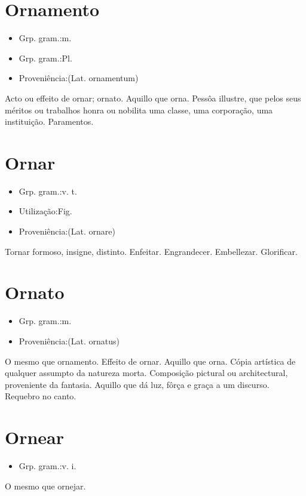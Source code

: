 \section{Ornamento}
\begin{itemize}
\item {Grp. gram.:m.}
\end{itemize}
\begin{itemize}
\item {Grp. gram.:Pl.}
\end{itemize}
\begin{itemize}
\item {Proveniência:(Lat. \textunderscore ornamentum\textunderscore )}
\end{itemize}
Acto ou effeito de ornar; ornato.
Aquillo que orna.
Pessôa illustre, que pelos seus méritos ou trabalhos honra ou nobilita uma classe, uma corporação, uma instituição.
Paramentos.
\section{Ornar}
\begin{itemize}
\item {Grp. gram.:v. t.}
\end{itemize}
\begin{itemize}
\item {Utilização:Fig.}
\end{itemize}
\begin{itemize}
\item {Proveniência:(Lat. \textunderscore ornare\textunderscore )}
\end{itemize}
Tornar formoso, insigne, distinto.
Enfeitar.
Engrandecer.
Embellezar.
Glorificar.
\section{Ornato}
\begin{itemize}
\item {Grp. gram.:m.}
\end{itemize}
\begin{itemize}
\item {Proveniência:(Lat. \textunderscore ornatus\textunderscore )}
\end{itemize}
O mesmo que \textunderscore ornamento\textunderscore .
Effeito de ornar.
Aquillo que orna.
Cópia artística de qualquer assumpto da natureza morta.
Composição pictural ou architectural, proveniente da fantasia.
Aquillo que dá luz, fôrça e graça a um discurso.
Requebro no canto.
\section{Ornear}
\begin{itemize}
\item {Grp. gram.:v. i.}
\end{itemize}
O mesmo que \textunderscore ornejar\textunderscore .
